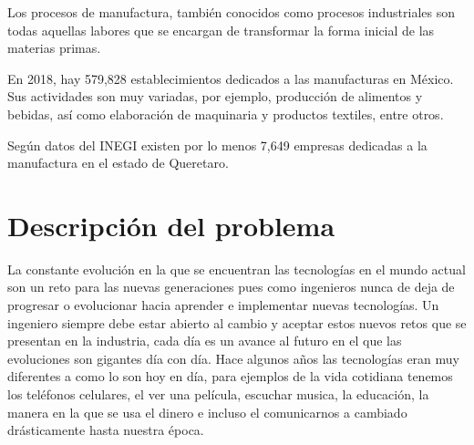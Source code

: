     Los procesos de manufactura, también conocidos como procesos industriales son todas aquellas labores que se encargan de transformar la forma inicial de las materias primas.
    
    
    En 2018, hay 579,828 establecimientos dedicados a las manufacturas en México. Sus actividades son muy variadas, por ejemplo, producción de alimentos y bebidas, así como elaboración de maquinaria y productos textiles, entre otros.
    
    Según datos del INEGI existen por lo menos 7,649 empresas dedicadas a la manufactura en el estado de Queretaro.
    
        
    \section{Descripción del problema}
    
    
    La constante evolución en la que se encuentran las tecnologías en el mundo actual son un reto para las nuevas generaciones pues como ingenieros nunca de deja de progresar o evolucionar hacia aprender e implementar nuevas tecnologías. 
    Un ingeniero siempre debe estar abierto al cambio y aceptar estos nuevos retos que se presentan en la industria, cada día es un avance al futuro en el que las evoluciones son gigantes día con día. Hace algunos años las tecnologías eran muy diferentes a como lo son hoy en día, para ejemplos de la vida cotidiana tenemos los teléfonos celulares, el ver una película, escuchar musica, la educación, la manera en la que se usa el dinero e incluso el comunicarnos a cambiado drásticamente hasta nuestra época.
    
